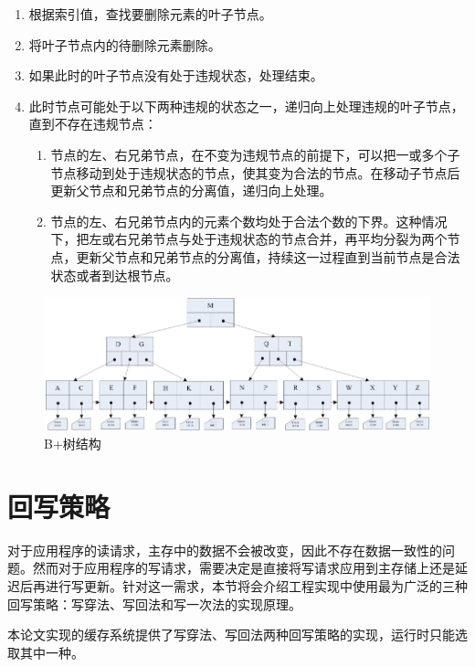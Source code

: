 \begin{itemize}
\begin{enumerate}
\item 根据索引值，查找要删除元素的叶子节点。
\item 将叶子节点内的待删除元素删除。
\item 如果此时的叶子节点没有处于违规状态，处理结束。
\item 此时节点可能处于以下两种违规的状态之一，递归向上处理违规的叶子节点，直到不存在违规节点：
\begin{enumerate}
\item 节点的左、右兄弟节点，在不变为违规节点的前提下，可以把一或多个子节点移动到处于违规状态的节点，使其变为合法的节点。在移动子节点后更新父节点和兄弟节点的分离值，递归向上处理。
\item 节点的左、右兄弟节点内的元素个数均处于合法个数的下界。这种情况下，把左或右兄弟节点与处于违规状态的节点合并，再平均分裂为两个节点，更新父节点和兄弟节点的分离值，持续这一过程直到当前节点是合法状态或者到达根节点。
\end{enumerate}
\end{enumerate}

\end{itemize}

\begin{figure}[H]
\centering
\includegraphics[width=1\linewidth]{./graph/bplus-tree}
\caption{B+树结构}
\label{fig:bplus-tree}
\end{figure}

\section{回写策略}
\label{sec:wb_strategy}

对于应用程序的读请求，主存中的数据不会被改变，因此不存在数据一致性的问题。然而对于应用程序的写请求，需要决定是直接将写请求应用到主存储上还是延迟后再进行写更新。针对这一需求，本节将会介绍工程实现中使用最为广泛的三种回写策略：写穿法、写回法和写一次法的实现原理。

本论文实现的缓存系统提供了写穿法、写回法两种回写策略的实现，运行时只能选取其中一种。

